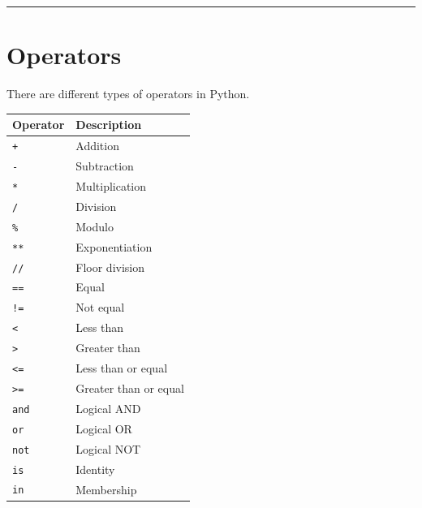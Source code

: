 \documentclass[
  letterpaper,
  DIV=11,
  numbers=noendperiod]{scrreprt}
\begin{document}
\begin{center}\rule{0.5\linewidth}{0.5pt}\end{center}

\chapter*{Operators}\label{operators}


There are different types of operators in Python.

\begin{longtable}[]{@{}ll@{}}
\toprule\noalign{}
Operator & Description \\
\midrule\noalign{}
\endhead
\bottomrule\noalign{}
\endlastfoot
\texttt{+} & Addition \\
\texttt{-} & Subtraction \\
\texttt{*} & Multiplication \\
\texttt{/} & Division \\
\texttt{\%} & Modulo \\
\texttt{**} & Exponentiation \\
\texttt{//} & Floor division \\
\texttt{==} & Equal \\
\texttt{!=} & Not equal \\
\texttt{\textless{}} & Less than \\
\texttt{\textgreater{}} & Greater than \\
\texttt{\textless{}=} & Less than or equal \\
\texttt{\textgreater{}=} & Greater than or equal \\
\texttt{and} & Logical AND \\
\texttt{or} & Logical OR \\
\texttt{not} & Logical NOT \\
\texttt{is} & Identity \\
\texttt{in} & Membership \\
\end{longtable}
\end{document}
